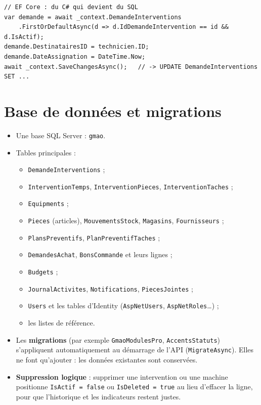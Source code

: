 \documentclass[11pt,a4paper]{article}
\newcommand{\code}[1]{\texttt{\small #1}}                   %
\begin{document}
\begin{lstlisting}[language={[Sharp]C}]
// EF Core : du C# qui devient du SQL
var demande = await _context.DemandeInterventions
    .FirstOrDefaultAsync(d => d.IdDemandeIntervention == id && d.IsActif);
demande.DestinatairesID = technicien.ID;
demande.DateAssignation = DateTime.Now;
await _context.SaveChangesAsync();   // -> UPDATE DemandeInterventions SET ...
\end{lstlisting}

\section{Base de données et migrations}

\begin{itemize}
  \item Une base SQL Server : \code{gmao}.
  \item Tables principales :
    \begin{itemize}
      \item \code{DemandeInterventions} ;
      \item \code{InterventionTemps}, \code{InterventionPieces}, \code{InterventionTaches} ;
      \item \code{Equipments} ;
      \item \code{Pieces} (articles), \code{MouvementsStock}, \code{Magasins}, \code{Fournisseurs} ;
      \item \code{PlansPreventifs}, \code{PlanPreventifTaches} ;
      \item \code{DemandesAchat}, \code{BonsCommande} et leurs lignes ;
      \item \code{Budgets} ;
      \item \code{JournalActivites}, \code{Notifications}, \code{PiecesJointes} ;
      \item \code{Users} et les tables d'Identity (\code{AspNetUsers}, \code{AspNetRoles}\ldots) ;
      \item les listes de référence.
    \end{itemize}
  \item Les \textbf{migrations} (par exemple \code{GmaoModulesPro}, \code{AccentsStatuts}) s'appliquent automatiquement au démarrage de l'API (\code{MigrateAsync}). Elles ne font qu'ajouter : les données existantes sont conservées.
  \item \textbf{Suppression logique} : supprimer une intervention ou une machine positionne \code{IsActif = false} ou \code{IsDeleted = true} au lieu d'effacer la ligne, pour que l'historique et les indicateurs restent justes.
\end{itemize}
\end{document}
